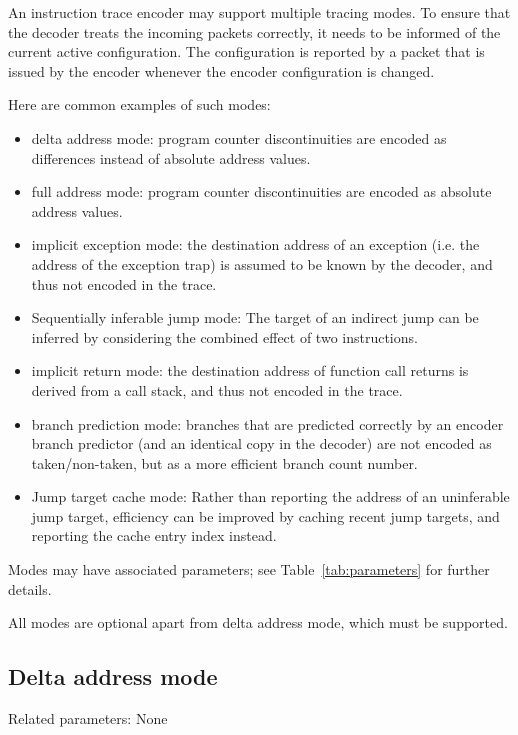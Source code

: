 An instruction trace encoder may support multiple tracing modes.
To ensure that the decoder treats the incoming packets
correctly, it needs to be informed of the current active configuration.
The configuration is reported by a packet that is issued by the encoder
whenever the encoder configuration is changed.

Here are common examples of such modes:

\begin{itemize}
  \item delta address mode:
    program counter discontinuities are encoded as differences instead of absolute address values.
  \item full address mode:
    program counter discontinuities are encoded as absolute address values.
  \item implicit exception mode:
    the destination address of an exception (i.e. the address of the exception trap) is assumed to 
    be known by the decoder, and thus not encoded in the trace.
  \item Sequentially inferable jump mode:
    The target of an indirect jump can be inferred by considering the combined effect of two instructions. 
  \item implicit return mode:
    the destination address of function call returns is derived from a call stack, and thus not encoded
    in the trace.
  \item branch prediction mode:
    branches that are predicted correctly by an encoder branch predictor (and an identical copy in the decoder)
    are not encoded as taken/non-taken, but as a more efficient branch count number.
  \item Jump target cache mode:
    Rather than reporting the address of an uninferable jump target, efficiency can be improved by caching
    recent jump targets, and reporting the cache entry index instead.
\end{itemize}

Modes may have associated parameters; see Table~\ref{tab:parameters} for further details.

All modes are optional apart from delta address mode, which must be supported.

\subsection{Delta address mode} \label{sec:delta-address}

Related parameters: None

